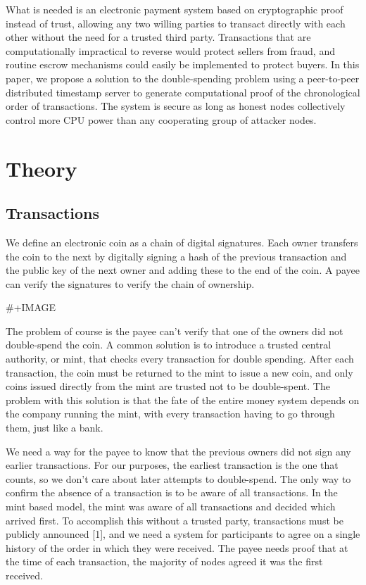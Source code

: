 \documentclass[11pt]{article}
\begin{document}
What is needed is an electronic payment system based on cryptographic proof instead of trust, allowing any two willing parties to transact directly with each other without the need for a trusted third party.
Transactions that are computationally impractical to reverse would protect sellers from fraud, and routine escrow mechanisms could easily be implemented to protect buyers.
In this paper, we propose a solution to the double-spending problem using a peer-to-peer distributed timestamp server to generate computational proof of the chronological order of transactions.
The system is secure as long as honest nodes collectively control more CPU power than any cooperating group of attacker nodes.

\section{Theory}
\label{sec:org262675a}
\subsection{Transactions}
\label{sec:org9975b61}
We define an electronic coin as a chain of digital signatures.
Each owner transfers the coin to the next by digitally signing a hash of the previous transaction and the public key of the next owner and adding these to the end of the coin.
A payee can verify the signatures to verify the chain of ownership.

\#+IMAGE

The problem of course is the payee can't verify that one of the owners did not double-spend the coin.
A common solution is to introduce a trusted central authority, or mint, that checks every transaction for double spending.
After each transaction, the coin must be returned to the mint to issue a new coin, and only coins issued directly from the mint are trusted not to be double-spent.
The problem with this solution is that the fate of the entire money system depends on the company running the mint, with every transaction having to go through them, just like a bank.

We need a way for the payee to know that the previous owners did not sign any earlier transactions.
For our purposes, the earliest transaction is the one that counts, so we don't care about later attempts to double-spend.
The only way to confirm the absence of a transaction is to be aware of all transactions.
In the mint based model, the mint was aware of all transactions and decided which arrived first.
To accomplish this without a trusted party, transactions must be publicly announced [1], and we need a system for participants to agree on a single history of the order in which they were received.
The payee needs proof that at the time of each transaction, the majority of nodes agreed it was the first received.
\end{document}
